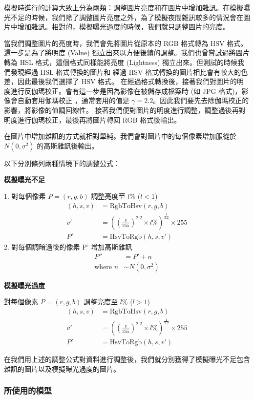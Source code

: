 模擬時進行的計算大致上分為兩類：調整圖片亮度和在圖片中增加雜訊。在模擬曝光不足的時候，我們除了調整圖片亮度之外，為了模擬夜間雜訊較多的情況會在圖片中增加雜訊。相對的，模擬曝光過度的時候，我們就只調整圖片的亮度。

當我們調整圖片的亮度時，我們會先將圖片從原本的 RGB 格式轉為 HSV 格式。這一步是為了將明度 (Value) 獨立出來以方便後續的調整。我們也曾嘗試過將圖片轉為 HSL 格式，這個格式同樣能將亮度 (Lightness) 獨立出來。但測試的時候我們發現經過 HSL 格式轉換的圖片和 經過 HSV 格式轉換的圖片相比會有較大的色差，因此最後我們選擇了 HSV 格式。
在經過格式轉換後，接著我們對圖片的明度進行反伽瑪校正。會有這一步是因為影像在被儲存成檔案時 (如 JPG 格式)，影像會自動套用伽瑪校正 ，通常套用的值是 $\gamma = 2.2$。因此我們要先去除伽瑪校正的影響，將影像的值調回線性。
接著我們便對圖片的明度進行調整，調整過後再對明度進行伽瑪校正，最後再將圖片轉回 RGB 格式後輸出。

在圖片中增加雜訊的方式就相對單純。我們會對圖片中的每個像素增加服從於 $N(0, \sigma^2)$ 的高斯雜訊後輸出。

以下分別條列兩種情境下的調整公式：

\textbf{模擬曝光不足}

1. 對每個像素 $P = (r, g, b)$ 調整亮度至 $l\%$ ($l < 1$)
\begin{align*}
(h, s, v) &= \text{RgbToHsv}(r, g, b) \\
v' &= ((\frac{v}{255})^{2.2} \times l\%)^{\frac{1}{2.2}} \times 255 \\
P' &= \text{HsvToRgb}(h, s, v')
\end{align*}
2. 對每個調暗過後的像素 P' 增加高斯雜訊
\begin{align*}
P'' &= P' + n\\
\text{where } n &\sim N(0, \sigma^2)
\end{align*}

\textbf{模擬曝光過度}

對每個像素 $P = (r, g, b)$ 調整亮度至 $l\%$ ($l > 1$)
\begin{align*}
(h, s, v) &= \text{RgbToHsv}(r, g, b) \\
v' &= ((\frac{v}{255})^{2.2} \times l\%)^{\frac{1}{2.2}} \times 255 \\
P' &= \text{HsvToRgb}(h, s, v')
\end{align*}

在我們用上述的調整公式對資料進行調整後，我們就分別獲得了模擬曝光不足包含雜訊的圖片以及模擬曝光過度的圖片。

\subsubsection{所使用的模型}

